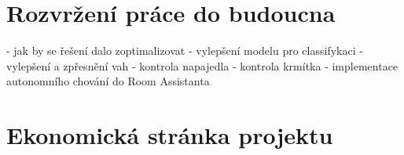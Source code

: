 \section{Rozvržení práce do budoucna}\label{sec:rozvrzeni-prace-do-budoucna}
- jak by se řešení dalo zoptimalizovat\newline
- vylepšení modelu pro classifykaci\newline
- vylepšení a zpřesnění vah\newline
- kontrola napajedla\newline
- kontrola krmítka
- implementace autonomního chování do Room Assistanta


\section{Ekonomická stránka projektu}\label{sec:ekonomicka-stranka-projektu}

